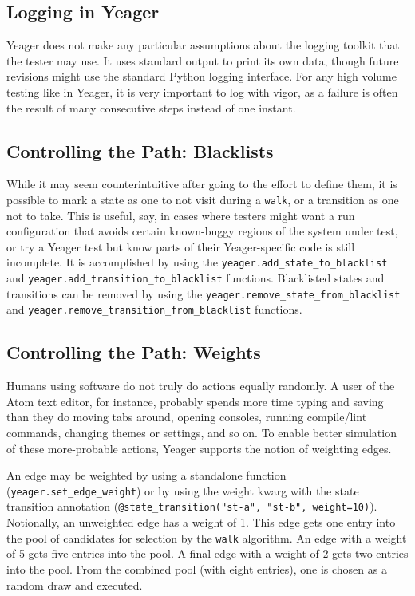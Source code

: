\subsection{Logging in Yeager}
Yeager does not make any particular assumptions about the logging toolkit that the tester may use. It uses standard output to print its own data, though future revisions might use the standard Python logging interface. For any high volume testing like in Yeager, it is very important to log with vigor, as a failure is often the result of many consecutive steps instead of one instant.

\subsection{Controlling the Path: Blacklists}
While it may seem counterintuitive after going to the effort to define them, it is possible to mark a state as one to not visit during a \texttt{walk}, or a transition as one not to take. This is useful, say, in cases where testers might want a run configuration that avoids certain known-buggy regions of the system under test, or try a Yeager test but know parts of their Yeager-specific code is still incomplete. It is accomplished by using the \texttt{yeager.add\_state\_to\_blacklist} and \texttt{yeager.add\_transition\_to\_blacklist} functions. Blacklisted states and transitions can be removed by using the \texttt{yeager.remove\_state\_from\_blacklist} and \texttt{yeager.remove\_transition\_from\_blacklist} functions.

\subsection{Controlling the Path: Weights}
Humans using software do not truly do actions equally randomly. A user of the Atom text editor, for instance, probably spends more time typing and saving than they do moving tabs around, opening consoles, running compile/lint commands, changing themes or settings, and so on. To enable better simulation of these more-probable actions, Yeager supports the notion of weighting edges.

An edge may be weighted by using a standalone function
\\(\texttt{yeager.set\_edge\_weight}) or by using the weight kwarg with the state transition annotation (\texttt{@state\_transition("st-a", "st-b", weight=10)}). Notionally, an unweighted edge has a weight of 1. This edge gets one entry into the pool of candidates for selection by the \texttt{walk} algorithm. An edge with a weight of 5 gets five entries into the pool. A final edge with a weight of 2 gets two entries into the pool. From the combined pool (with eight entries), one is chosen as a random draw and executed.

